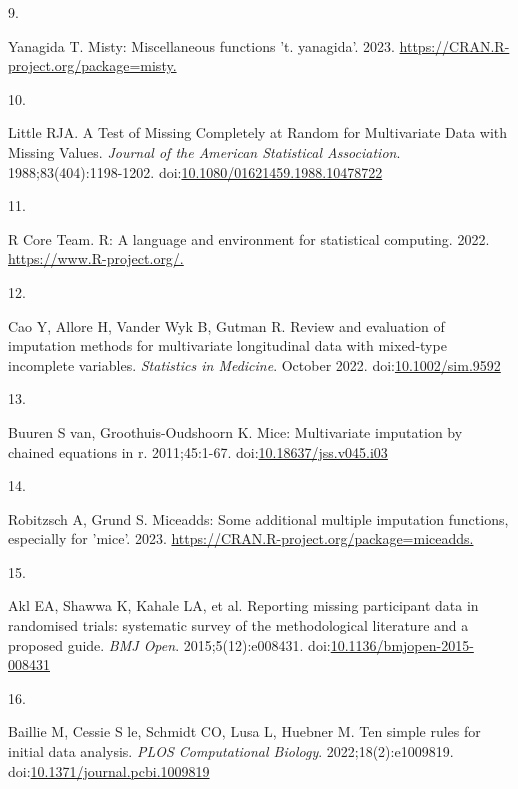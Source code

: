 \documentclass[
]{book}
\newlength{\cslhangindent}
\newlength{\csllabelwidth}
\newlength{\cslentryspacingunit} %
\newenvironment{CSLReferences}[2] %
 {%
  \setlength{\parindent}{0pt}
  \ifodd #1
  \let\oldpar\par
  \def\par{\hangindent=\cslhangindent\oldpar}
  \fi
  \setlength{\parskip}{#2\cslentryspacingunit}
 }%
 {}
\newcommand{\CSLLeftMargin}[1]{\parbox[t]{\csllabelwidth}{#1}}
\newcommand{\CSLRightInline}[1]{\parbox[t]{\linewidth - \csllabelwidth}{#1}\break}
\begin{document}
\begin{CSLReferences}{0}{0}
\leavevmode{}%
\CSLLeftMargin{9. }%
\CSLRightInline{Yanagida T. Misty: Miscellaneous functions 't. yanagida'. 2023. \href{https://CRAN.R-project.org/package=misty}{https://CRAN.R-project.org/package=misty.}}

\leavevmode{}%
\CSLLeftMargin{10. }%
\CSLRightInline{Little RJA. A Test of Missing Completely at Random for Multivariate Data with Missing Values. \emph{Journal of the American Statistical Association}. 1988;83(404):1198-1202. doi:\href{https://doi.org/10.1080/01621459.1988.10478722}{10.1080/01621459.1988.10478722}}

\leavevmode{}%
\CSLLeftMargin{11. }%
\CSLRightInline{R Core Team. R: A language and environment for statistical computing. 2022. \href{https://www.R-project.org/}{https://www.R-project.org/.}}

\leavevmode{}%
\CSLLeftMargin{12. }%
\CSLRightInline{Cao Y, Allore H, Vander Wyk B, Gutman R. Review and evaluation of imputation methods for multivariate longitudinal data with mixed{-}type incomplete variables. \emph{Statistics in Medicine}. October 2022. doi:\href{https://doi.org/10.1002/sim.9592}{10.1002/sim.9592}}

\leavevmode{}%
\CSLLeftMargin{13. }%
\CSLRightInline{Buuren S van, Groothuis-Oudshoorn K. {\textbraceleft}Mice{\textbraceright}: Multivariate imputation by chained equations in r. 2011;45:1-67. doi:\href{https://doi.org/10.18637/jss.v045.i03}{10.18637/jss.v045.i03}}

\leavevmode{}%
\CSLLeftMargin{14. }%
\CSLRightInline{Robitzsch A, Grund S. Miceadds: Some additional multiple imputation functions, especially for 'mice'. 2023. \href{https://CRAN.R-project.org/package=miceadds}{https://CRAN.R-project.org/package=miceadds.}}

\leavevmode{}%
\CSLLeftMargin{15. }%
\CSLRightInline{Akl EA, Shawwa K, Kahale LA, et al. Reporting missing participant data in randomised trials: systematic survey of the methodological literature and a proposed guide. \emph{BMJ Open}. 2015;5(12):e008431. doi:\href{https://doi.org/10.1136/bmjopen-2015-008431}{10.1136/bmjopen-2015-008431}}

\leavevmode{}%
\CSLLeftMargin{16. }%
\CSLRightInline{Baillie M, Cessie S le, Schmidt CO, Lusa L, Huebner M. Ten simple rules for initial data analysis. \emph{PLOS Computational Biology}. 2022;18(2):e1009819. doi:\href{https://doi.org/10.1371/journal.pcbi.1009819}{10.1371/journal.pcbi.1009819}}


\end{CSLReferences}
\end{document}
